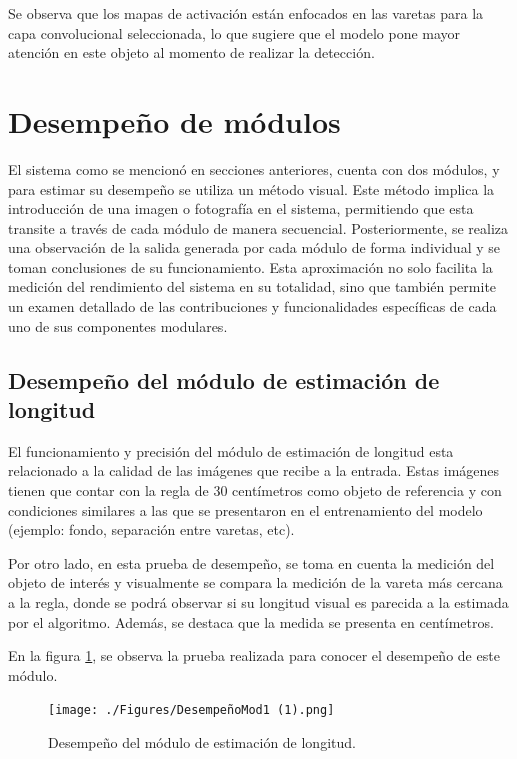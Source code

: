 Se observa que los mapas de activación están enfocados en las varetas para la capa convolucional seleccionada, lo que sugiere que el modelo pone mayor atención en este objeto al momento de realizar la detección.   

\section{Desempeño de módulos}
\label{sec:desempeñoModulos}

El sistema como se mencionó en secciones anteriores, cuenta con dos módulos, y para estimar su desempeño se utiliza un método visual. Este método implica la introducción de una imagen o fotografía en el sistema, permitiendo que esta transite a través de cada módulo de manera secuencial. Posteriormente, se realiza una observación de la salida generada por cada módulo de forma individual y se toman conclusiones de su funcionamiento. Esta aproximación no solo facilita la medición del rendimiento del sistema en su totalidad, sino que también permite un examen detallado de las contribuciones y funcionalidades específicas de cada uno de sus componentes modulares.

\subsection{Desempeño del módulo de estimación de longitud}

El funcionamiento y precisión del módulo de estimación de longitud esta relacionado a la calidad de las imágenes que recibe a la entrada. Estas imágenes tienen que contar con la regla de 30 centímetros como objeto de referencia y con condiciones similares a las que se presentaron en el entrenamiento del modelo (ejemplo: fondo, separación entre varetas, etc).

Por otro lado, en esta prueba de desempeño, se toma en cuenta la medición del objeto de interés y visualmente se compara la medición de la vareta más cercana a la regla, donde se podrá observar si su longitud visual es parecida a la estimada por el algoritmo. Además, se destaca que la medida se presenta en centímetros.

En la figura \ref{fig:DempeñoEstimacionLongitud}, se observa la prueba realizada para conocer el desempeño de este módulo.

\begin{figure}[ht]
	\centering
	\texttt{[image: ./Figures/DesempeñoMod1 (1).png]}
	\caption{Desempeño del módulo de estimación de longitud.}
	\label{fig:DempeñoEstimacionLongitud}
\end{figure}
\newpage

